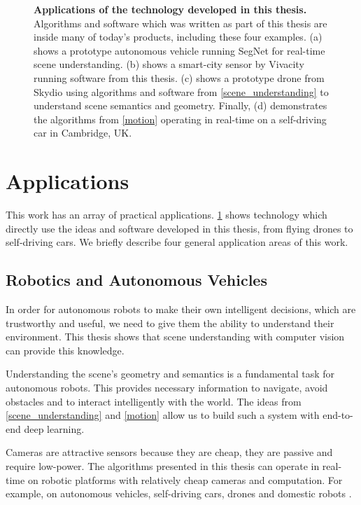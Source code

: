 \begin{figure}[pt]
\begin{subfigure}[t]{0.98\textwidth}
    \end{subfigure}%
\caption[Applications of technology in this thesis]{\textbf{Applications of the technology developed in this thesis.} Algorithms and software which was written as part of this thesis are inside many of today's products, including these four examples. (a) shows a prototype autonomous vehicle running SegNet for real-time scene understanding. (b) shows a smart-city sensor by Vivacity \citep{vivacity} running software from this thesis. (c) shows a prototype drone from Skydio \citep{skydio} using algorithms and software from \cref{scene_understanding} to understand scene semantics and geometry. Finally, (d) demonstrates the algorithms from \cref{motion} operating in real-time on a self-driving car in Cambridge, UK.}
\label{ch6:applications}
\end{figure} 

\section{Applications}

This work has an array of practical applications. \cref{ch6:applications} shows technology which directly use the ideas and software developed in this thesis, from flying drones to self-driving cars. We briefly describe four general application areas of this work.


\subsection{Robotics and Autonomous Vehicles}
In order for autonomous robots to make their own intelligent decisions, which are trustworthy and useful, we need to give them the ability to understand their environment. This thesis shows that scene understanding with computer vision can provide this knowledge.

Understanding the scene’s geometry and semantics is a fundamental task for autonomous robots. This provides necessary information to navigate, avoid obstacles and to interact intelligently with the world. The ideas from \cref{scene_understanding} and \cref{motion} allow us to build such a system with end-to-end deep learning.

Cameras are attractive sensors because they are cheap, they are passive and require low-power. The algorithms presented in this thesis can operate in real-time on robotic platforms with relatively cheap cameras and computation. For example, on autonomous vehicles, self-driving cars, drones and domestic robots \citep{kendall2014board,mcallister2017av_bdl,kendall2018learning}.

